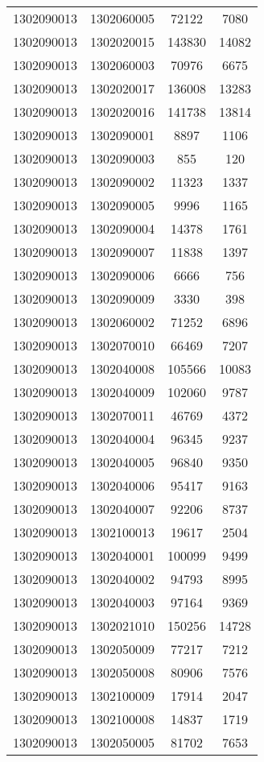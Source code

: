 \begin{longtable}[h]{llcc}
		1302090013 & 1302060005 & 72122 & 7080\\
		1302090013 & 1302020015 & 143830 & 14082\\
		1302090013 & 1302060003 & 70976 & 6675\\
		1302090013 & 1302020017 & 136008 & 13283\\
		1302090013 & 1302020016 & 141738 & 13814\\
		1302090013 & 1302090001 & 8897 & 1106\\
		1302090013 & 1302090003 & 855 & 120\\
		1302090013 & 1302090002 & 11323 & 1337\\
		1302090013 & 1302090005 & 9996 & 1165\\
		1302090013 & 1302090004 & 14378 & 1761\\
		1302090013 & 1302090007 & 11838 & 1397\\
		1302090013 & 1302090006 & 6666 & 756\\
		1302090013 & 1302090009 & 3330 & 398\\
		1302090013 & 1302060002 & 71252 & 6896\\
		1302090013 & 1302070010 & 66469 & 7207\\
		1302090013 & 1302040008 & 105566 & 10083\\
		1302090013 & 1302040009 & 102060 & 9787\\
		1302090013 & 1302070011 & 46769 & 4372\\
		1302090013 & 1302040004 & 96345 & 9237\\
		1302090013 & 1302040005 & 96840 & 9350\\
		1302090013 & 1302040006 & 95417 & 9163\\
		1302090013 & 1302040007 & 92206 & 8737\\
		1302090013 & 1302100013 & 19617 & 2504\\
		1302090013 & 1302040001 & 100099 & 9499\\
		1302090013 & 1302040002 & 94793 & 8995\\
		1302090013 & 1302040003 & 97164 & 9369\\
		1302090013 & 1302021010 & 150256 & 14728\\
		1302090013 & 1302050009 & 77217 & 7212\\
		1302090013 & 1302050008 & 80906 & 7576\\
		1302090013 & 1302100009 & 17914 & 2047\\
		1302090013 & 1302100008 & 14837 & 1719\\
		1302090013 & 1302050005 & 81702 & 7653\\

\end{longtable}
